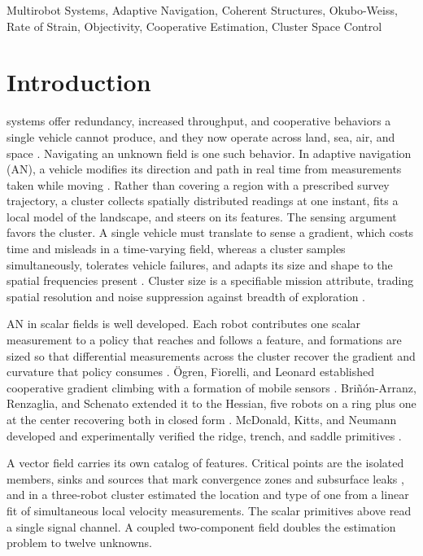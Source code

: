 \documentclass[lettersize,journal]{IEEEtran}
\begin{document}
\begin{IEEEkeywords}
Multirobot Systems, Adaptive Navigation, Coherent Structures,
Okubo-Weiss, Rate of Strain, Objectivity, Cooperative
Estimation, Cluster Space Control
\end{IEEEkeywords}

\section{Introduction}

 systems offer redundancy, increased
throughput, and cooperative behaviors a single vehicle cannot produce,
and they now operate across land, sea, air, and space \cite{1}.
Navigating an unknown field is one such behavior. In adaptive
navigation (AN), a vehicle modifies its direction and path in real time
from measurements taken while moving \cite{2}. Rather than covering a region with a prescribed survey trajectory, a
cluster collects spatially distributed readings at one instant, fits a
local model of the landscape, and steers on its features. The
sensing argument favors the cluster. A single vehicle must translate to sense a
gradient, which costs time and misleads in a time-varying field,
whereas a cluster samples simultaneously, tolerates vehicle failures,
and adapts its size and shape to the spatial frequencies present
\cite{2,3}. Cluster size is a specifiable mission attribute, trading
spatial resolution and noise suppression against breadth of exploration
\cite{4}.

AN in scalar fields is well developed. Each
robot contributes one scalar measurement to a policy that reaches and
follows a feature, and formations are sized so that differential
measurements across the cluster recover the gradient and curvature that
policy consumes \cite{4,5}. \"{O}gren, Fiorelli, and Leonard
established cooperative gradient climbing with a formation of mobile
sensors \cite{5}. Bri\~{n}\'{o}n-Arranz, Renzaglia, and Schenato
extended it to the Hessian, five robots on a ring plus one at the
center recovering both in closed form \cite{4}. McDonald, Kitts, and
Neumann developed and experimentally verified the ridge, trench, and
saddle primitives \cite{2,3,6}.

A vector field carries its own catalog of features. Critical points are
the isolated members, sinks and sources that mark convergence zones and
subsurface leaks \cite{7}, and in \cite{8} a three-robot cluster
estimated the location and type of one from a linear fit of
simultaneous local velocity measurements. The scalar primitives above
read a single signal channel. A coupled two-component field doubles the
estimation problem to twelve unknowns.
\end{document}
